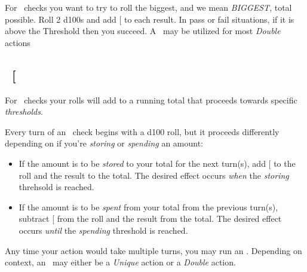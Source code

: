 
\noindent For \POWEful\ checks you want to try to roll the biggest, and we mean \emph{BIGGEST}, total possible.
\noindent Roll 2 d100s and add {[}\POWE{]} to each result. In pass or fail situations, if it is above the Threshold then you succeed.
\fillrlinemid
\noindent A \POWE\ may be utilized for most \emph{Double} actions


\subsection{\ENDUful\ {[}\ENDU\index{\attribute!\ENDUful}{]}}\label{subsec:end}


\noindent For \ENDUful\ checks your rolls will add to a running total that proceeds towards specific \emph{thresholds}.

\noindent Every turn of an \ENDU\ check begins with a d100 roll, but it proceeds differently depending on if you're \emph{storing} or \emph{spending} an amount:
\begin{itemize}
	\item If the amount is to be \emph{stored} to your total for the next turn(s), add {[}\ENDU{]} to the roll and the result to the total. The desired effect occurs \emph{when} the \textit{storing} threhsold is reached.
	\item If the amount is to be \emph{spent} from your total from the previous turn(s), subtract {[}\ENDU{]} from the roll and the result from the total. The desired effect occurs \emph{until} the \textit{spending} threshold is reached.
\end{itemize}
\fillrlinemid
\noindent Any time your action would take multiple turns, you may run an \ENDU. Depending on context, an \ENDU\  may either be a \emph{Unique} action or a \emph{Double} action.


\noindent {}

